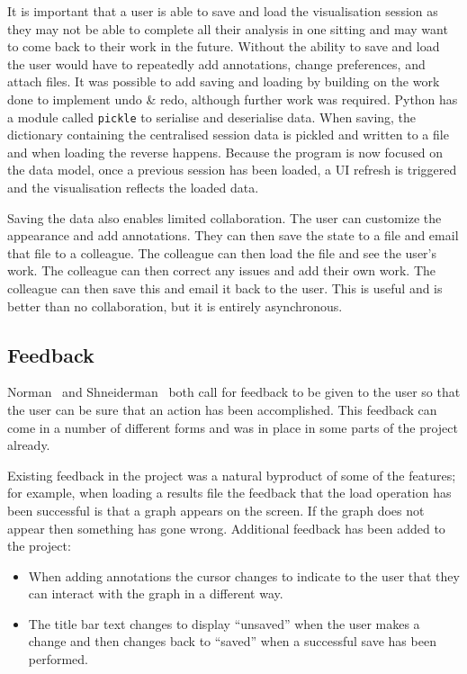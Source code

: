 It is important that a user is able to save and load the visualisation session as they may not be able to complete all their analysis in one sitting and may want to come back to their work in the future.  Without the ability to save and load the user would have to repeatedly add annotations, change preferences, and attach files.  It was possible to add saving and loading by building on the work done to implement undo \& redo, although further work was required. Python has a module called \texttt{pickle} to serialise and deserialise data.  When saving, the dictionary containing the centralised session data is pickled and written to a file and when loading the reverse happens.  Because the program is now focused on the data model, once a previous session has been loaded, a \ac{UI} refresh is triggered and the visualisation reflects the loaded data.

Saving the data also enables limited collaboration.  The user can customize the appearance and add annotations.  They can then save the state to a file and email that file to a colleague.  The colleague can then load the file and see the user's work.  The colleague can then correct any issues and add their own work.  The colleague can then save this and email it back to the user.  This is useful and is better than no collaboration, but it is entirely asynchronous.

\subsection{Feedback}
\label{sec:feedback}
Norman~\cite{normsev} and Shneiderman~\cite{shgold} both call for feedback to be given to the user so that the user can be sure that an action has been accomplished.  This feedback can come in a number of different forms and was in place in some parts of the project already.

Existing feedback in the project was a natural byproduct of some of the features; for example, when loading a results file the feedback that the load operation has been successful is that a graph appears on the screen. If the graph does not appear then something has gone wrong.  Additional feedback has been added to the project:
\begin{itemize}
\item When adding annotations the cursor changes to indicate to the user that they can interact with the graph in a different way.
\item The title bar text changes to display ``unsaved'' when the user makes a change and then changes back to ``saved'' when a successful save has been performed.
\end{itemize}

